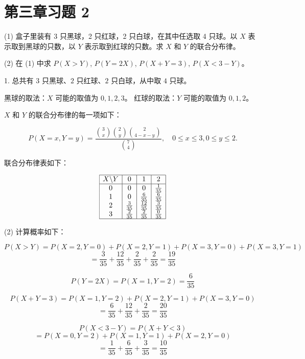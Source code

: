 \documentclass[twoside]{article}
\begin{document}
\maketitle
\vspace{-3.5em}

\tableofcontents

\section{第三章习题 2}

(1) 盒子里装有 3 只黑球，2 只红球，2 只白球，在其中任选取 4 只球。以 $X$ 表示取到黑球的只数，以 $Y$ 表示取到红球的只数。求 $X$ 和 $Y$ 的联合分布律。

(2) 在 (1) 中求 $P(X > Y)$, $P(Y = 2X)$, $P(X + Y = 3)$, $P(X < 3 - Y)$。

\begin{ans}{2}{2}

    1. 总共有 $3$ 只黑球、$2$ 只红球、$2$ 只白球，从中取 $4$ 只球。

    黑球的取法：$X$ 可能的取值为 $0, 1, 2, 3$。  
    红球的取法：$Y$ 可能的取值为 $0, 1, 2$。
    
     $X$ 和 $Y$ 的联合分布律的每一项如下：

    \[
    P(X = x, Y = y) = \frac{\binom{3}{x} \binom{2}{y} \binom{2}{4 - x - y}}{\binom{7}{4}}, \quad 0 \leq x \leq 3, 0 \leq y \leq 2.
    \]
    
    联合分布律表如下：
    
    \[
    \begin{array}{|c|c|c|c|}
    \hline
    X \backslash Y & 0 & 1 & 2 \\
    \hline
    0 & 0 & 0 & \frac{1}{35} \\
    1 & 0 & \frac{6}{35} & \frac{6}{35} \\
    2 & \frac{3}{35} & \frac{12}{35} & \frac{3}{35} \\
    3 & \frac{2}{35} & \frac{2}{35} & \frac{0}{35} \\
    \hline
    \end{array}
    \]
    
    (2) 计算概率如下：

\[
P(X > Y) = P(X = 2, Y = 0) + P(X = 2, Y = 1) + P(X = 3, Y = 0) + P(X = 3, Y = 1)
\]
\[
= \frac{3}{35} + \frac{12}{35} + \frac{2}{35} + \frac{2}{35} = \frac{19}{35}
\]

\[
P(Y = 2X) = P(X = 1, Y = 2) = \frac{6}{35}
\]

\[
P(X + Y = 3) = P(X = 1, Y = 2) + P(X = 2, Y = 1) + P(X = 3, Y = 0)
\]
\[
= \frac{6}{35} + \frac{12}{35} + \frac{2}{35} = \frac{20}{35}
\]

\[
P(X < 3 - Y) = P(X + Y < 3)
\]
\[
= P(X = 0, Y = 2) + P(X = 1, Y = 1) + P(X = 2, Y = 0)
\]
\[
= \frac{1}{35} + \frac{6}{35} + \frac{3}{35} = \frac{10}{35}
\]

\end{ans}
\end{document}
